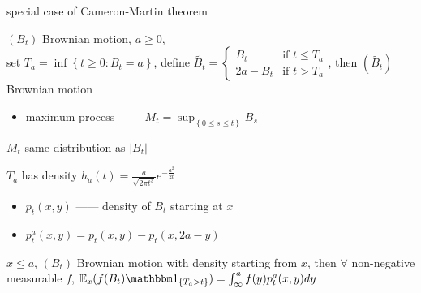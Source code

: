 \begin{fact}
    special case of Cameron-Martin theorem
\end{fact}

\begin{prop}
    $(B_t)$ Brownian motion, $a \geq 0$,\\ set $T_a = \inf \left\{ t \geq 0 : B_t = a \right\}$, define $\tilde{B_t} = \begin{cases}
                                                                                                                         B_t & \text{if }t \leq T_a\\
                                                                                                                         2a - B_t & \text{if }t > T_a
    \end{cases}$, then $(\tilde{B_t})$ Brownian motion
\end{prop}

\begin{itemize}
    \item maximum process ------ $M_t = \sup_{\left\{ 0 \leq s \leq t \right\}} B_s$
\end{itemize}

\begin{fact}
    $M_t$ same distribution as $|B_t|$
\end{fact}

\begin{prop}
    $T_a$ has density $h_a(t) = \frac{a}{\sqrt{2\pi t^3}}e^{-\frac{a^2}{2t}}$
\end{prop}

\begin{itemize}
    \item $p_t(x, y)$ ------ density of $B_t$ starting at $x$
    \item $p_t^a(x, y) = p_t(x, y) - p_t(x, 2a - y)$
\end{itemize}

\begin{prop}
    $x \leq a$, $(B_t)$ Brownian motion with density starting from $x$, then $\forall$ non-negative measurable $f$,
    $\Ex_x(f(B_t)\In_{\left\{ T_a > t \right\}}) = \int^a_\infty f(y)p_t^a(x, y)dy$
\end{prop}